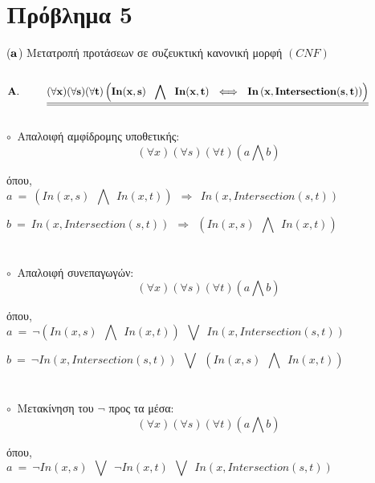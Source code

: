 \documentclass[10pt]{article}
\begin{document}
\section*{Πρόβλημα 5}
\vspace{5mm}
($\bf a$) \normalfont Μετατροπή προτάσεων σε συζευκτική κανονική μορφή $(CNF)$ \\ \\
\[ \bf A. \ \ \ \ \ \ \ \ \underline{\underline{
(\forall x)(\forall s)(\forall t) \left( In(x,s) \ \ \bigwedge \ \ In(x,t) \ \ \Longleftrightarrow  \ \ In\left( x, Intersection(s,t)\right )  \right )}}
 \ \ \ \ \ \ \ \ \ \ \ \ \] \\
 
$\circ \ $ Απαλοιφή αμφίδρομης υποθετικής:
\[
(\forall x)(\forall s)(\forall t) \left(a \bigwedge b \right ) \]

όπου, \\
\[
a \ = \ \left(  In(x,s) \ \ \bigwedge \ \ In(x,t)  \right ) \ \ \Longrightarrow  \ \ In( x, Intersection(s,t)) \ \ \ \ \ \ \ \ \ \ \ \ \ \ \ \ \ \ \ \  \ \ \ \ \ \ \ \ \ \ \ \ \ \ \ \ \ \ \ \ \ \ \ \ \ \ \ \ 
\]

\[
b \ = \ In( x, Intersection(s,t)) \ \ \Longrightarrow  \ \ \left(  In(x,s) \ \ \bigwedge \ \ In(x,t)  \right ) \ \ \ \ \ \ \ \ \ \ \ \ \ \ \ \ \ \ \ \  \ \ \ \ \ \ \ \ \ \ \ \ \ \ \ \ \ \ \ \ \ \ \ \ \ \ \ \ 
\]\\ \\
 
$\circ \ $ Απαλοιφή συνεπαγωγών:
\[
(\forall x)(\forall s)(\forall t) \left(a \bigwedge b \right ) \]

όπου, \\
\[
a \ = \ \neg \left (  In(x,s) \ \ \bigwedge \ \ In(x,t)  \right ) \ \ \bigvee  \ \ In( x, Intersection(s,t)) \ \ \ \ \ \ \ \ \ \ \ \ \ \ \ \ \ \ \ \  \ \ \ \ \ \ \ \ \ \ \ \ \ \ \ \ \ \ \ \ \ \ \ \ \ \ \ \ 
\]

\[
b \ = \ \neg In( x, Intersection(s,t)) \ \ \bigvee  \ \ \left(  In(x,s) \ \ \bigwedge \ \ In(x,t)  \right ) \ \ \ \ \ \ \ \ \ \ \ \ \ \ \ \ \ \ \ \  \ \ \ \ \ \ \ \ \ \ \ \ \ \ \ \ \ \ \ \ \ \ \ \ \ \ \ \ 
\]\\ \\
 
$\circ \ $ Μετακίνηση του $\neg$ προς τα μέσα:
\[
(\forall x)(\forall s)(\forall t) \left(a \bigwedge b \right ) \]

όπου, \\
\[
a \ = \ \neg  In(x,s) \ \ \bigvee \ \  \neg In(x,t) \ \ \bigvee  \ \ In( x, Intersection(s,t)) \ \ \ \ \ \ \ \ \ \ \ \ \ \ \ \ \ \ \ \  \ \ \ \ \ \ \ \ \ \ \ \ \ \ \ \ \ \ \ \ \ \ \ \ \ \ \ \ 
\]
\end{document}
